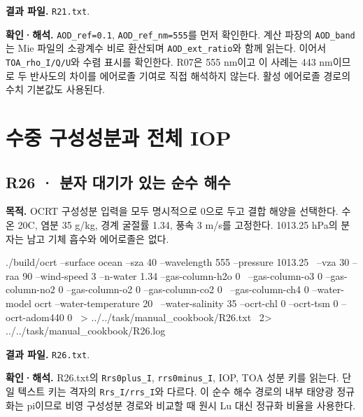 \textbf{결과 파일. }\texttt{R21.txt}.

\textbf{확인·해석. }\texttt{AOD\_\allowbreak{}ref=0.1}, \texttt{AOD\_\allowbreak{}ref\_\allowbreak{}nm=555}를 먼저 확인한다. 계산 파장의 \texttt{AOD\_\allowbreak{}band}는 Mie 파일의 소광계수 비로 환산되며 \texttt{AOD\_\allowbreak{}ext\_\allowbreak{}ratio}와 함께 읽는다. 이어서 \texttt{TOA\_\allowbreak{}rho\_\allowbreak{}I/Q/U}와 수렴 표시를 확인한다. R07은 555 nm이고 이 사례는 443 nm이므로 두 반사도의 차이를 에어로졸 기여로 직접 해석하지 않는다. 활성 에어로졸 경로의 수치 기본값도 사용된다.

\clearpage

\section{수중 구성성분과 전체 IOP}

\label{sec:auto:09_cookbook:5}

\label{sec:cookbook_group:ocean}

\subsection{R26 · 분자 대기가 있는 순수 해수}
\label{sec:auto:09_cookbook:5.1}

\label{recipe:R26}

\textbf{목적. }OCRT 구성성분 입력을 모두 명시적으로 0으로 두고 결합 해양을 선택한다. 수온 20\textdegree{}C, 염분 35 g/kg, 경계 굴절률 1.34, 풍속 3 m/s를 고정한다. 1013.25 hPa의 분자는 남고 기체 흡수와 에어로졸은 없다.

\noindent\begin{minipage}{\linewidth}
\begin{ManualCode}

./build/ocrt --surface ocean --sza 40 --wavelength 555 --pressure 1013.25 \
  --vza 30 --raa 90 --wind-speed 3 --n-water 1.34 --gas-column-h2o 0 \
  --gas-column-o3 0 --gas-column-no2 0 --gas-column-o2 0 --gas-column-co2 0 \
  --gas-column-ch4 0 --water-model ocrt --water-temperature 20 \
  --water-salinity 35 --ocrt-chl 0 --ocrt-tsm 0 --ocrt-adom440 0 \
  > ../../task/manual_cookbook/R26.txt \
  2> ../../task/manual_cookbook/R26.log

\end{ManualCode}
\end{minipage}\par

\textbf{결과 파일. }\texttt{R26.txt}.

\textbf{확인·해석. }R26.txt의 \texttt{Rrs0plus\_\allowbreak{}I}, \texttt{rrs0minus\_\allowbreak{}I}, IOP, TOA 성분 키를 읽는다. 단일 텍스트 키는 격자의 \texttt{Rrs\_\allowbreak{}I/\allowbreak{}rrs\_\allowbreak{}I}와 다르다. 이 순수 해수 경로의 내부 태양광 정규화는 pi이므로 비영 구성성분 경로와 비교할 때 원시 Lu 대신 정규화 비율을 사용한다.

